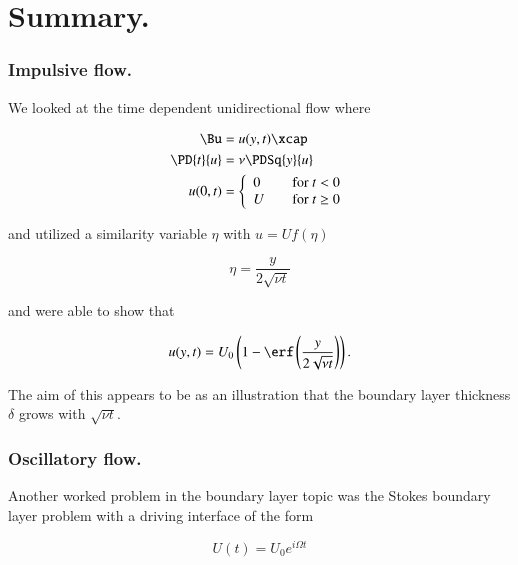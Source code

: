\section{Summary.}
\subsubsection{Impulsive flow.}

We looked at the time dependent unidirectional flow where

\begin{align}\label{eqn:continuumFluidsReview:2230}
\Bu &= u(y, t) \xcap \\
\PD{t}{u} &= \nu \PDSq{y}{u} \\
u(0, t) &=
\left\{
\begin{array}{l l}
0 & \quad \mbox{for $t < 0$} \\
U & \quad \mbox{for $t \ge 0$}
\end{array}
\right.
\end{align}

and utilized a similarity variable $\eta$ with $u = U f(\eta)$

\begin{equation}\label{eqn:continuumFluidsReview:2250}
\eta = \frac{y}{2 \sqrt{\nu t}}
\end{equation}

and were able to show that

\begin{equation}\label{eqn:continuumFluidsReview:2270}
u(y, t) = U_0 \left(1 - \erf\left(\frac{y}{2 \sqrt{\nu t}}\right) \right).
\end{equation}

The aim of this appears to be as an illustration that the boundary layer thickness $\delta$ grows with $\sqrt{\nu t}$.


\subsubsection{Oscillatory flow.}

Another worked problem in the boundary layer topic was the Stokes boundary layer problem with a driving interface of the form

\begin{equation}\label{eqn:continuumFluidsReview:2370}
U(t) = U_0 e^{i \Omega t}
\end{equation}

